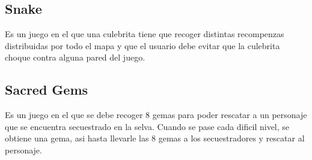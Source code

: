 \documentclass{article}
\begin{document}
\subsection{Snake}
Es un juego en el que una culebrita tiene que recoger distintas recompenzas distribuidas por todo el mapa y que el usuario debe evitar que la culebrita choque contra alguna pared del juego.

\subsection{Sacred Gems}
Es un juego en el que se debe recoger 8 gemas para poder rescatar a un personaje que se encuentra secuestrado en la selva. Cuando se pase cada dificil nivel, se obtiene una gema, asi hasta llevarle las 8 gemas a los secuestradores y rescatar al personaje.
\end{document}
